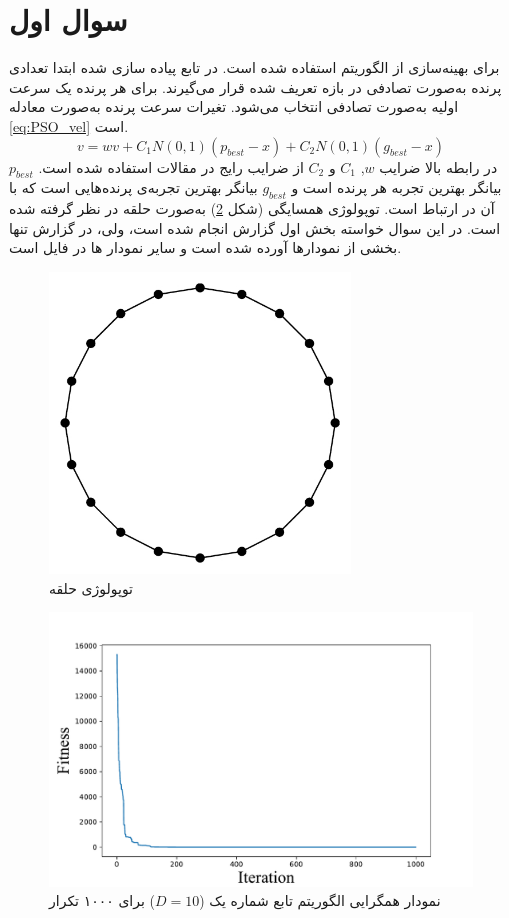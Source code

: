 \section{سوال اول}
برای بهینه‌سازی از الگوریتم 
استفاده شده است. در تابع پیاده سازی شده ابتدا تعدادی پرنده به‌صورت تصادفی در بازه تعریف شده قرار می‌گیرند. برای هر پرنده یک سرعت اولیه به‌صورت تصادفی انتخاب می‌شود. تغیرات سرعت پرنده به‌صورت معادله
\ref{eq:PSO_vel}
 است.
\begin{equation}\label{eq:PSO_vel}
	v = w v + C_1  N(0, 1)  (p_{best} - x) + C_2   N(0, 1)  (g_{best} - x)
\end{equation}
در رابطه بالا ضرایب
 $w$, 
 $C_1$
 و
 $C_2$ 
 از ضرایب رایج در مقالات استفاده شده است. $p_{best}$ بیانگر بهترین تجربه هر پرنده است و
 $g_{best}$
 بیانگر بهترین تجربه‌ی پرنده‌هایی است که با آن در ارتباط است. توپولوژی همسایگی (شکل \ref{fig:ring}) به‌صورت حلقه 
 در نظر گرفته شده است.
 در این سوال خواسته بخش اول گزارش
 انجام شده است، ولی، در گزارش تنها بخشی از نمودارها آورده شده است و سایر نمودار ها در فایل
 است.
 \begin{figure}[H]\label{fig:ring}
 	\caption{توپولوژی حلقه} 
 	\centering 
 	\includegraphics[width=8cm]{../Figure/Q1/ring.jpg} 
 \end{figure}

 \begin{figure}[H]\label{fig:ring}
	\caption{نمودار همگرایی الگوریتم  تابع شماره یک ($D=10$) برای ۱۰۰۰ تکرار } 
	\centering 
	\includegraphics[width=16cm]{../Figure/Q1/PSO_convergence_curve} 
\end{figure}

